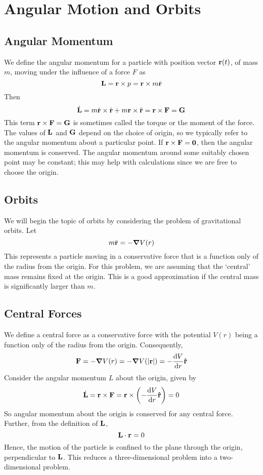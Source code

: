 \documentclass{article}
\begin{document}
\section{Angular Motion and Orbits}
\subsection{Angular Momentum}
We define the angular momentum for a particle with position vector $\vb r(t)$, of mass $m$, moving under the influence of a force $F$ as
\[ \vb L = \vb r \times p = \vb r \times m \dot{\vb r} \]
Then
\[ \dot{\vb L} = m\dot{\vb r} \times \dot{\vb r} + m\vb r \times \ddot{\vb r} = \vb r \times \vb F = \vb G \]
This term $\vb r \times \vb F = \vb G$ is sometimes called the torque or the moment of the force. The values of $\vb L$ and $\vb G$ depend on the choice of origin, so we typically refer to the angular momentum about a particular point. If $\vb r \times \vb F = \vb 0$, then the angular momentum is conserved. The angular momentum around some suitably chosen point may be constant; this may help with calculations since we are free to choose the origin.

\subsection{Orbits}
We will begin the topic of orbits by considering the problem of gravitational orbits. Let
\[ m\ddot{\vb r} = -\grad V(r) \]
This represents a particle moving in a conservative force that is a function only of the radius from the origin. For this problem, we are assuming that the `central' mass remains fixed at the origin. This is a good approximation if the central mass is significantly larger than $m$.

\subsection{Central Forces}
We define a central force as a conservative force with the potential $V(r)$ being a function only of the radius from the origin. Consequently,
\[ \vb F = -\grad V(r) = -\grad V(\abs{\vb r}) = -\frac{\dd{V}}{\dd{r}}\vu{r} \]
Consider the angular momentum $L$ about the origin, given by
\[ \dot{\vb L} = \vb r \times \vb F = \vb r \times \left(-\frac{\dd{V}}{\dd{r}}\vu{r}\right) = 0 \]
So angular momentum about the origin is conserved for any central force. Further, from the definition of $\vb L$,
\[ \vb L \cdot \vb r = 0 \]
Hence, the motion of the particle is confined to the plane through the origin, perpendicular to $\vb L$. This reduces a three-dimensional problem into a two-dimensional problem.
\end{document}
